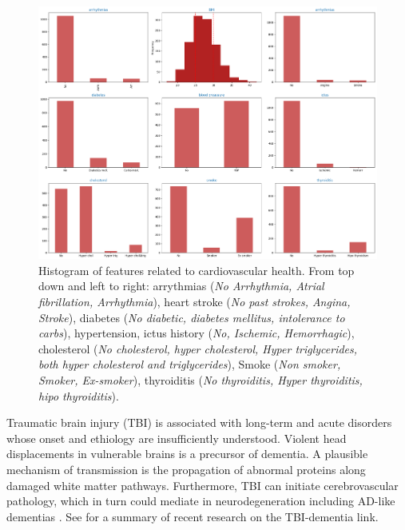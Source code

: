 \documentclass[11pt]{article}
\theoremstyle{definition}
\theoremstyle{remark}
\begin{document}
\begin{figure}[!htb]
        \centering
        \includegraphics[keepaspectratio, width=\linewidth]{figures/Fig_cardio}
        \caption{Histogram of features related to cardiovascular health. From top down and left to right: arrythmias (\emph{No Arrhythmia, Atrial fibrillation, Arrhythmia}), heart stroke (\emph{No past strokes, Angina, Stroke}), diabetes (\emph{No diabetic, diabetes mellitus, intolerance to carbs}), hypertension, ictus history (\emph{No, Ischemic, Hemorrhagic}), cholesterol (\emph{No cholesterol, hyper cholesterol, Hyper triglycerides, both hyper cholesterol and triglycerides}), Smoke (\emph{Non smoker, Smoker, Ex-smoker}), thyroiditis (\emph{No thyroiditis, Hyper thyroiditis, hipo thyroiditis}).} 
        \label{fig:cardio}
\end{figure}



Traumatic brain injury (TBI) is associated with long-term and acute disorders whose onset and ethiology are insufficiently understood. Violent head displacements in vulnerable brains is a precursor of dementia. A plausible mechanism of transmission is the propagation of abnormal proteins along damaged white matter pathways. Furthermore, TBI can initiate cerebrovascular pathology, which in turn could mediate in neurodegeneration including AD-like dementias \cite{ramos2018traumatic}. See \cite{mendez2017relationship} for a summary of recent research on the TBI-dementia link. 
\end{document}
